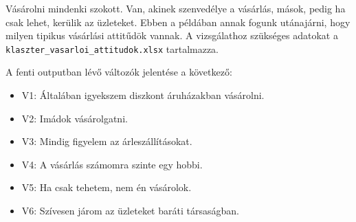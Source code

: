 \documentclass[
  letterpaper,
]{krantz}
\makeatletter
\newenvironment{Shaded}{\begin{snugshade}}{\end{snugshade}}
\newcommand{\AttributeTok}[1]{\textcolor[rgb]{0.40,0.45,0.13}{#1}}
\newcommand{\CommentTok}[1]{\textcolor[rgb]{0.37,0.37,0.37}{#1}}
\newcommand{\FunctionTok}[1]{\textcolor[rgb]{0.28,0.35,0.67}{#1}}
\newcommand{\NormalTok}[1]{\textcolor[rgb]{0.00,0.23,0.31}{#1}}
\newcommand{\OtherTok}[1]{\textcolor[rgb]{0.00,0.23,0.31}{#1}}
\newcommand{\SpecialCharTok}[1]{\textcolor[rgb]{0.37,0.37,0.37}{#1}}
\newcommand{\StringTok}[1]{\textcolor[rgb]{0.13,0.47,0.30}{#1}}
\providecommand{\tightlist}{%
  \setlength{\itemsep}{0pt}\setlength{\parskip}{0pt}}\usepackage{longtable,booktabs,array}
\newenvironment{kframe}{%
\medskip{}
\setlength{\fboxsep}{.8em}
 \def\at@end@of@kframe{}%
 \ifinner\ifhmode%
  \def\at@end@of@kframe{\end{minipage}}%
  \begin{minipage}{\columnwidth}%
 \fi\fi%
 \def\FrameCommand##1{\hskip\@totalleftmargin \hskip-\fboxsep
 \colorbox{shadecolor}{##1}\hskip-\fboxsep
     \hskip-\linewidth \hskip-\@totalleftmargin \hskip\columnwidth}%
 \MakeFramed {\advance\hsize-\width
   \@totalleftmargin\z@ \linewidth\hsize
   \@setminipage}}%
 {\par\unskip\endMakeFramed%
 \at@end@of@kframe}
\renewenvironment{Shaded}{\begin{kframe}}{\end{kframe}}
\makeatother
\begin{document}
Vásárolni mindenki szokott. Van, akinek szenvedélye a vásárlás, mások,
pedig ha csak lehet, kerülik az üzleteket. Ebben a példában annak fogunk
utánajárni, hogy milyen tipikus vásárlási attitűdök vannak. A
vizsgálathoz szükséges adatokat a
\texttt{klaszter\_vasarloi\_attitudok.xlsx} tartalmazza.

\begin{Shaded}
\end{Shaded}

A fenti outputban lévő változók jelentése a következő:

\begin{itemize}
\tightlist
\item
  V1: Általában igyekszem diszkont áruházakban vásárolni.
\item
  V2: Imádok vásárolgatni.
\item
  V3: Mindig figyelem az árleszállításokat.
\item
  V4: A vásárlás számomra szinte egy hobbi.
\item
  V5: Ha csak tehetem, nem én vásárolok.
\item
  V6: Szívesen járom az üzleteket baráti társaságban.
\end{itemize}
\end{document}
